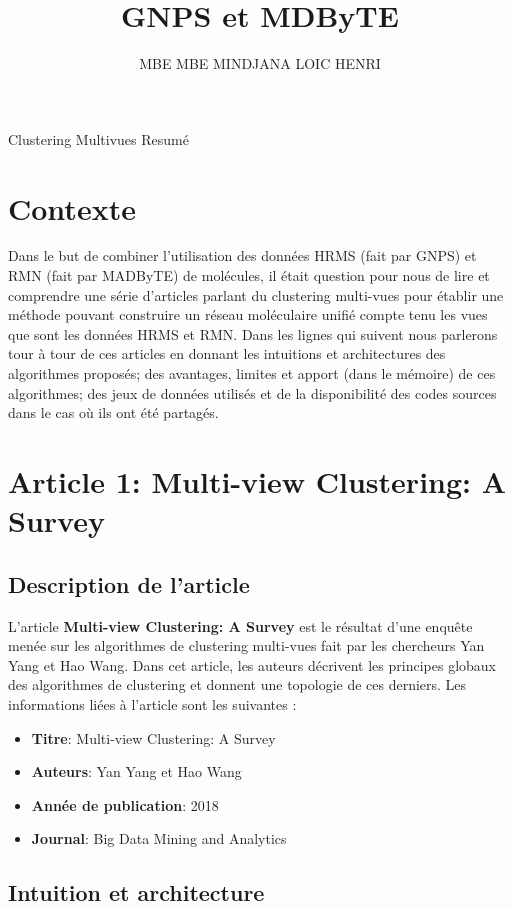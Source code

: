 \documentclass[12pt, french, latin.medieval, a4paper]{report}
\author{MBE MBE MINDJANA LOIC HENRI}
\title{GNPS et MDByTE}
\begin{document}
    
    \pagecouverture
    {Clustering Multivues}
    {Resumé}
	\tableofcontents
	\vspace{20cm}
    
	\section{Contexte}
    	Dans le but de combiner l'utilisation des données HRMS (fait par GNPS) et RMN (fait par MADByTE) de molécules, il était question pour nous de lire et comprendre une série d'articles parlant du clustering multi-vues pour établir une méthode pouvant construire un réseau moléculaire unifié compte tenu les vues que sont les données HRMS et RMN.
    	Dans les lignes qui suivent nous parlerons tour à tour de ces articles en donnant les intuitions et architectures des algorithmes proposés; des avantages, limites et apport (dans le mémoire) de ces algorithmes; des jeux de données utilisés et de la disponibilité des codes sources dans le cas où ils ont été partagés.

	\section{Article 1: Multi-view Clustering: A Survey}
    	\subsection{Description de l'article}
    	L'article \textbf{Multi-view Clustering: A Survey} \cite{yang2018multi} est le résultat d'une enquête menée sur les algorithmes de clustering multi-vues fait par les chercheurs Yan Yang et Hao Wang. Dans cet article, les auteurs décrivent les principes globaux des algorithmes de clustering et donnent une topologie de ces derniers. Les informations liées à l'article sont les suivantes :
    	\begin{itemize}
        	\item \textbf{Titre}: Multi-view Clustering: A Survey
        	\item \textbf{Auteurs}: Yan Yang et Hao Wang
        	\item \textbf{Année de publication}: 2018
        	\item \textbf{Journal}: Big Data Mining and Analytics
    	\end{itemize}

    	\subsection{Intuition et architecture}
\end{document}
